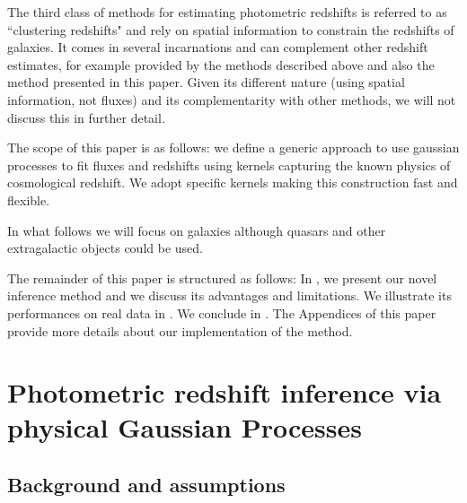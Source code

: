 \documentclass[aps,prd,showpacs,superscriptaddress,groupedaddress]{revtex4}  %
\begin{document}
The third class of methods for estimating photometric redshifts is referred to as ``clustering redshifts" and rely on spatial information to constrain the redshifts of galaxies.
It comes in several incarnations and can complement other redshift estimates, for example provided by the methods described above and also the method presented in this paper.
Given its different nature (using spatial information, not fluxes) and its complementarity with other methods, we will not discuss this in further detail.


The scope of this paper is as follows: we define a generic approach to use gaussian processes to fit fluxes and redshifts using kernels capturing the known physics of cosmological redshift.
We adopt specific kernels making this construction fast and flexible.


In what follows we will focus on galaxies although quasars and other extragalactic objects could be used.

The remainder of this paper is structured as follows: In , we present our novel \photoz inference method and we discuss its advantages and limitations. We illustrate its performances on real data in . We conclude in . The Appendices of this paper provide more details about our implementation of the method.


\section{Photometric redshift inference via physical Gaussian Processes}\label{sec:methods}


\subsection{Background and assumptions}
\end{document}

